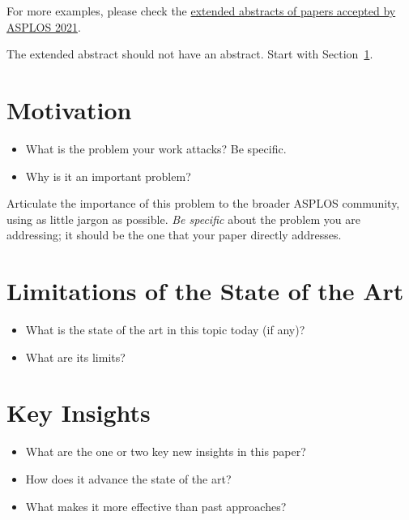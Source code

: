 \documentclass[pageno]{jpaper}
\begin{document}
For more examples, please check the 
\href{https://asplos-conference.org/2021/index.html\%3Fp=2181.html}
{extended abstracts of papers accepted
by ASPLOS 2021}.



The extended abstract should not have an abstract. Start with Section~\ref{sec:motivation}.

\section{Motivation}
\label{sec:motivation}


\begin{itemize}
\item What is the problem your work attacks? Be specific.
\item Why is it an important problem?
\end{itemize}

\vspace{1em}

\noindent
Articulate the importance of this problem to the broader ASPLOS
community, using as little jargon as possible. \emph{Be specific}
about the problem you are addressing; it should be the one that your
paper directly addresses.

\section{Limitations of the State of the Art}
\label{sec:limitations}

\begin{itemize}
\item What is the state of the art in this topic today (if any)?
\item What are its limits?
\end{itemize}

\section{Key Insights}
\label{sec:key-insights}

\begin{itemize}
\item What are the one or two key new insights in this paper?
\item How does it advance the state of the art?
\item What makes it more effective than past approaches?
\end{itemize}
\end{document}
